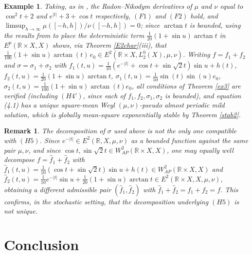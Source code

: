 \documentclass[11pt]{amsart}
\newtheorem{remark}[theorem]{Remark}
\newtheorem{example}[theorem]{Example}
\begin{document}
\begin{example}
Taking, as in \cite{LiWeyl}, the Radon--Nikodym derivatives of $\mu$ and $\nu$ equal to $\cos^2t+2$ and $e^{|t|}+3+\cos t$ respectively, $(F1)$ and $(F2)$ hold, and $\limsup_{h\to\infty}\mu([-h,h])/\nu([-h,h])=0$; since $\arctan t$ is bounded, using the results from \cite{LiWeyl} to place the deterministic term $\tfrac1{20}(1+\sin u)\arctan t$ in $E^p(\mathbb R\times X,X)$ shows, via Theorem \ref{E2char}(iii), that $\tfrac1{100}(1+\sin u)\arctan(t)\,e_0\in E^2(\mathbb R\times X,L^0_2(X),\mu,\nu)$. Writing $f=f_1+f_2$ and $\sigma=\sigma_1+\sigma_2$ with $f_1(t,u)=\tfrac1{10}(e^{-|t|}+\cos t+\sin\sqrt2t)\sin u+h(t)$, $f_2(t,u)=\tfrac1{20}(1+\sin u)\arctan t$, $\sigma_1(t,u)=\tfrac1{50}\sin(t)\sin(u)e_0$, $\sigma_2(t,u)=\tfrac1{100}(1+\sin u)\arctan(t)e_0$, all conditions of Theorem \ref{ex3} are verified (including $(H4')$, since each of $f_1,f_2,\sigma_1,\sigma_2$ is bounded), and equation (4.1) has a unique square-mean Weyl $(\mu,\nu)$-pseudo almost periodic mild solution, which is globally mean-square exponentially stable by Theorem \ref{stab2}.
\end{example}

\begin{remark}
The decomposition of $\sigma$ used above is not the only one compatible with $(H5)$. Since $e^{-|t|}\in E^2(\mathbb R,X,\mu,\nu)$ as a bounded function against the same pair $\mu,\nu$, and since $\cos t,\sin\sqrt2t\in W^2_{AP}(\mathbb R\times X,X)$, one may equally well decompose $f=\widehat f_1+\widehat f_2$ with $\widehat f_1(t,u)=\tfrac1{10}(\cos t+\sin\sqrt2t)\sin u+h(t)\in W^2_{AP}(\mathbb R\times X,X)$ and $\widehat f_2(t,u)=\tfrac1{10}e^{-|t|}\sin u+\tfrac1{20}(1+\sin u)\arctan t\in E^2(\mathbb R\times X,X,\mu,\nu)$, obtaining a different admissible pair $(\widehat f_1,\widehat f_2)$ with $\widehat f_1+\widehat f_2=f_1+f_2=f$. This confirms, in the stochastic setting, that the decomposition underlying $(H5)$ is not unique.
\end{remark}

\section{Conclusion}
\end{document}
